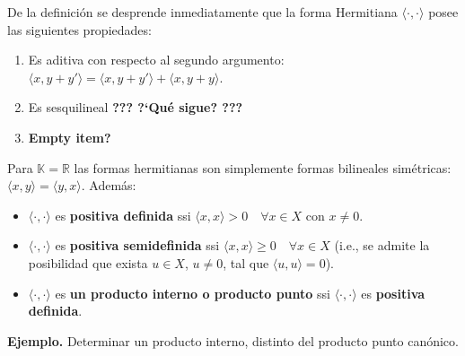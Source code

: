 \documentclass[12pt,reqno]{amsart}
\begin{document}
\smallskip\noindent
De la definici\'on se desprende inmediatamente que la forma Hermitiana
$\langle\cdot,\cdot\rangle$ posee las siguientes propiedades:
\begin{enumerate}
\item
Es aditiva con respecto al segundo argumento:
$\langle x,y+y'\rangle = \langle x,y+y'\rangle+\langle x,y+y\rangle$.
\item
Es sesquilineal {\color{red}\bf ??? ?`Qu\'e sigue? ???}
\item
{\color{red}\bf Empty item?}
\end{enumerate}

\smallskip\noindent
Para $\mathbb{K}=\mathbb{R}$ las formas hermitianas son simplemente
formas bilineales sim\'etricas: 
$\langle x,y \rangle= \langle y,x \rangle$.
Adem\'as:
\begin{itemize}
\item
$\langle\cdot,\cdot\rangle$ es \textbf{positiva definida} ssi
$\langle x,x\rangle > 0\quad\forall x\in X$ con $x\neq0$.
\item
$\langle\cdot,\cdot\rangle$ es \textbf{positiva semidefinida} ssi
$\langle x,x\rangle\geq0\quad\forall x\in X$
(i.e., se admite la posibilidad que exista $u\in X$, $u\neq0$,
tal que $\langle u,u\rangle=0$).
\item
$\langle\cdot,\cdot \rangle$  es 
\textbf{un producto interno o producto punto} ssi 
$\langle\cdot,\cdot\rangle$ es \textbf{positiva definida}.
\end{itemize}

\medskip\noindent
\textbf{Ejemplo.}
Determinar un producto interno, distinto del producto punto can\'onico.
\end{document}

